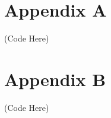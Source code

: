 
\chapter*{Appendix A}
\label{sec:appendixa}
(Code Here)

\chapter*{Appendix B}
(Code Here)


\newpage

